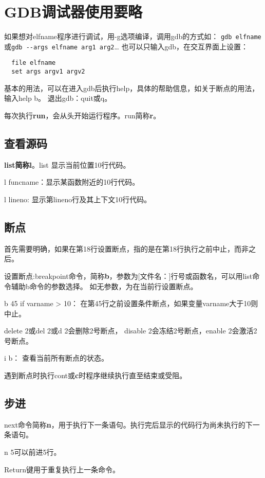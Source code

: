 \section{GDB调试器使用要略}


如果想对elfname程序进行调试，用-g选项编译，调用gdb的方式如：
\verb+gdb elfname+或\verb+gdb --args elfname arg1 arg2+\ldots
也可以只输入gdb，在交互界面上设置：
\begin{verbatim}
  file elfname
  set args argv1 argv2
\end{verbatim}


基本的用法，可以在进入gdb后执行help，具体的帮助信息，如关于断点的用法，输入help b。
退出gdb：quit或q。

每次执行\textbf{run}，会从头开始运行程序。run简称\textbf{r}。

\subsection{查看源码}
\textbf{list简称l}。list 显示当前位置10行代码。

l funcname：显示某函数附近的10行代码。

l lineno: 显示第lineno行及其上下文10行代码。


\subsection{断点}
首先需要明确，如果在第18行设置断点，指的是在第18行执行之前中止，而非之后。

设置断点:breakpoint命令，简称\textbf{b}，参数为[文件名：]行号或函数名，可以用list命令辅助b命令的参数选择。
如无参数，为在当前行设置断点。

b 45 if varname > 10： 在第45行之前设置条件断点，如果变量varname大于10则中止。

delete 2或del 2或d 2会删除2号断点， disable 2会冻结2号断点，enable 2会激活2号断点。

i b： 查看当前所有断点的状态。

遇到断点时执行cont或\textbf{c}时程序继续执行直至结束或受阻。

\subsection{步进}
next命令简称\textbf{n}，用于执行下一条语句。执行完后显示的代码行为尚未执行的下一条语句。

n 5可以前进5行。

Return键用于重复执行上一条命令。

